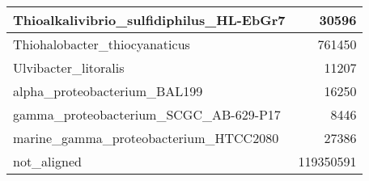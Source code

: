 \documentclass[12pt,a4paper]{article}
\begin{document}
\begin{table}[ht]
\begin{center}
\begin{tabular}{|l*{1}{|r}|}
Thioalkalivibrio\_sulfidiphilus\_HL-EbGr7 & 30596 \\ \hline
Thiohalobacter\_thiocyanaticus & 761450 \\ \hline
Ulvibacter\_litoralis & 11207 \\ \hline
alpha\_proteobacterium\_BAL199 & 16250 \\ \hline
gamma\_proteobacterium\_SCGC\_AB-629-P17 & 8446 \\ \hline
marine\_gamma\_proteobacterium\_HTCC2080 & 27386 \\ \hline
not\_aligned & 119350591 \\ \hline
\end{tabular}
\end{center}
\end{table}
\end{document}
